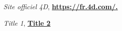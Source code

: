 
\begin{thebibliography}{99}
    
    
    \emph{Site officiel 4D},
    \href{https://fr.4d.com/.}{\textbf{https://fr.4d.com/.}}
    
    
    \emph{Title 1},
    \href{https://www.overleaf.com/learn/latex/Bibliography_management_with_bibtex}{\textbf{Title 2}}
    
    
    
    
    \end{thebibliography}